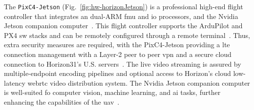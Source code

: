 
  The \lstinline{PixC4-Jetson} (Fig.~\ref{fig:hw-horizonJetson}) is a
  professional high-end flight controller that integrates an dual-ARM
  \gls{fmu} and \gls{io} processors, and the Nvidia Jetson companion
  computer~\cite{arduPilot-horizonJetson}. This flight controller supports the
  ArduPilot and PX4 \gls{sw} stacks and can be remotely configured through a
  remote terminal~\cite{arduPilot-horizonJetson}. Thus, extra security measures are required, with the
  PixC4-Jetson providing a \gls{lte} connection management with a Layer-2 peer
  to peer \gls{vpn} and a secure cloud connection to Horizon31's
  U.S. servers~\cite{arduPilot-horizonJetson}. The live video streaming is
  assured by multiple-endpoint encoding pipelines and optional access to
  Horizon's cloud low-latency web\gls{rtc} video distribution system.
  The Nvidia Jetson companion computer is well-suited fo computer vision,
  machine learning, and \gls{ai} tasks, further enhancing the capabilities of
  the \gls{uav}~\cite{jetson-docs}.

